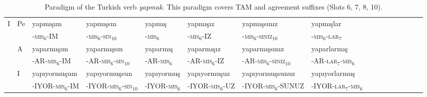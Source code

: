 \documentclass[11pt,letterpaper]{article}
\begin{document}
\begin{table}
{\begin{tabular}{ll||llllllllllllll}
 I     & Pe & yapmışım &	yapmışsın &	yapmış &	yapmışız &	yapmışsınız &	yapmışlar \\
       &  & -\textsc{mis}$_6$-IM &	-\textsc{mis}$_6$-\textsc{sin}$_{10}$ &	-\textsc{mis}$_6$ &	-\textsc{mis}$_6$-IZ &	-\textsc{mis}$_6$-\textsc{siniz}$_{10}$ &	-\textsc{mis}$_6$-\textsc{lar}$_{7}$ \\ \hline
               & A & yaparmışım &	yaparmışsın &	yaparmış &	yaparmışız &	yaparmışsınız& 	yaparlarmış \\ 
            &  & -AR-\textsc{mis}$_6$-IM &	-AR-\textsc{mis}$_6$-\textsc{sin}$_{10}$ &	-AR-\textsc{mis}$_6$ &	-AR-\textsc{mis}$_6$-IZ &	-AR-\textsc{mis}$_6$-\textsc{siniz}$_{10}$& 	-AR-\textsc{lar}$_{7}$-\textsc{mis}$_6$ \\ \hline
               & I & yapıyormuşum &	yapıyormuşsun &	yapıyormuş &	yapıyormuşuz &	yapıyormuşsunuz &	yapıyorlarmuş \\
               &              & -IYOR-\textsc{mis}$_6$-IM &	-IYOR-\textsc{mis}$_6$-\textsc{sin}$_{10}$ &	-IYOR-\textsc{mis}$_6$ &	-IYOR-\textsc{mis}$_6$-UZ &	-IYOR-\textsc{mis}$_6$-SUNUZ &	-IYOR-\textsc{lar}$_{7}$-\textsc{mis}$_6$ \\
\end{tabular}
}
\caption{Paradigm of the Turkish verb \textit{yapmak}. This paradigm covers TAM and agreement suffixes (Slots 6, 7, 8, 10).}\label{tab:turkish-yapmak}
\end{table}
\end{document}
